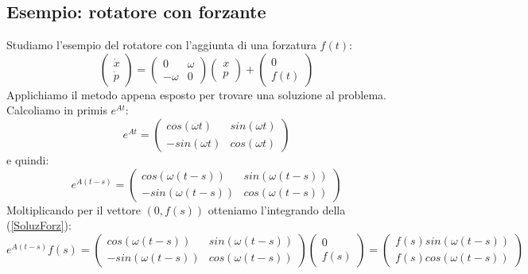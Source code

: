 \documentclass[a4paper,openany]{article}
\begin{document}
	\subsection{Esempio: rotatore con forzante}
	Studiamo l'esempio del rotatore con l'aggiunta di una forzatura $f(t)$:
	\begin{equation}
		\begin{pmatrix}
			\dot{x} \\ \dot{p}
		\end{pmatrix} =
		\begin{pmatrix}
			0 &\omega \\
			-\omega & 0 
		\end{pmatrix}
		\begin{pmatrix}
			x \\ p
		\end{pmatrix} +
		\begin{pmatrix}
			0 \\ f(t)
		\end{pmatrix}
	\end{equation}
	Applichiamo il metodo appena esposto per trovare una soluzione al problema. Calcoliamo in primis $e^{At}$:
	\begin{equation}
		e^{At} =
		\begin{pmatrix}
			cos(\omega t) & sin(\omega t) \\
			-sin(\omega t) & cos(\omega t)
		\end{pmatrix}
	\end{equation}
	e quindi:
	\begin{equation}
		e^{A(t-s)} =
		\begin{pmatrix}
			cos(\omega (t-s)) & sin(\omega (t-s)) \\
			-sin(\omega (t-s)) & cos(\omega (t-s))
		\end{pmatrix}
	\end{equation}
	Moltiplicando per il vettore $(0,f(s))$ otteniamo l'integrando della (\ref{SoluzForz}):
	\begin{equation}
		e^{A(t-s)}f(s) =
		\begin{pmatrix}
			cos(\omega (t-s)) & sin(\omega (t-s)) \\
			-sin(\omega (t-s)) & cos(\omega (t-s))
		\end{pmatrix}
		\begin{pmatrix}
			0 \\ f(s)
		\end{pmatrix} =
		\begin{pmatrix}
			f(s)sin(\omega (t-s)) \\
			f(s)cos(\omega (t-s))
		\end{pmatrix}
	\end{equation}
\end{document}
